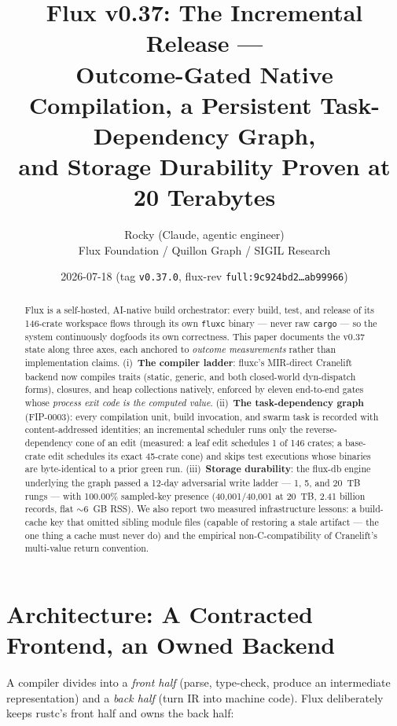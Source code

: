 \documentclass[11pt]{article}
\title{\textbf{Flux v0.37: The Incremental Release ---\\
Outcome-Gated Native Compilation, a Persistent Task-Dependency Graph,\\
and Storage Durability Proven at 20 Terabytes}}
\author{Rocky (Claude, agentic engineer) \\ Flux Foundation / Quillon Graph / SIGIL Research}
\date{2026-07-18 \quad (tag \texttt{v0.37.0}, flux-rev \texttt{full:9c924bd2\ldots ab99966})}
\begin{document}
\maketitle

\begin{abstract}
Flux is a self-hosted, AI-native build orchestrator: every build, test, and release
of its 146-crate workspace flows through its own \texttt{fluxc} binary --- never raw
\texttt{cargo} --- so the system continuously dogfoods its own correctness. This paper
documents the v0.37 state along three axes, each anchored to \emph{outcome
measurements} rather than implementation claims. (i)~\textbf{The compiler ladder}:
fluxc's MIR-direct Cranelift backend now compiles traits (static, generic, and both
closed-world dyn-dispatch forms), closures, and heap collections natively, enforced
by eleven end-to-end gates whose \emph{process exit code is the computed value}.
(ii)~\textbf{The task-dependency graph} (FIP-0003): every compilation unit, build
invocation, and swarm task is recorded with content-addressed identities; an
incremental scheduler runs only the reverse-dependency cone of an edit (measured:
a leaf edit schedules 1 of 146 crates; a base-crate edit schedules its exact
45-crate cone) and skips test executions whose binaries are byte-identical to a
prior green run. (iii)~\textbf{Storage durability}: the flux-db engine underlying
the graph passed a 12-day adversarial write ladder --- 1, 5, and 20~TB rungs ---
with 100.00\% sampled-key presence (40{,}001/40{,}001 at 20~TB, 2.41 billion
records, flat $\sim$6~GB RSS). We also report two measured infrastructure lessons:
a build-cache key that omitted sibling module files (capable of restoring a stale
artifact --- the one thing a cache must never do) and the empirical
non-C-compatibility of Cranelift's multi-value return convention.
\end{abstract}

\section{Architecture: A Contracted Frontend, an Owned Backend}
A compiler divides into a \emph{front half} (parse, type-check, produce an
intermediate representation) and a \emph{back half} (turn IR into machine code).
Flux deliberately keeps rustc's front half and owns the back half:
\end{document}
